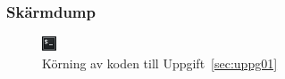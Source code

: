 \subsubsection{Skärmdump}
\begin{figure}[htbp]
    \centering
        \includegraphics[width=\linewidth]{img/01.png}
    \caption{Körning av koden till Uppgift~\ref{sec:uppg01}}
\label{fig:uppg01-screenshot}
\end{figure}

